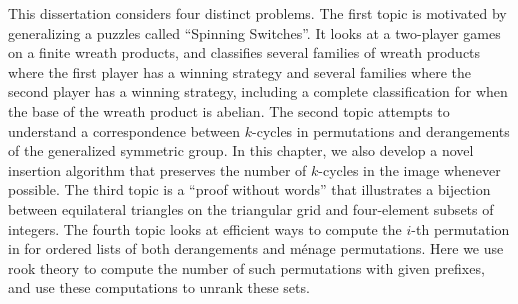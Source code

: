 This dissertation considers four distinct problems.
The first topic is motivated by generalizing a puzzles called
``Spinning Switches''. It looks at a two-player games on a finite wreath
products, and classifies several families of wreath products where
the first player has a winning strategy and several families where the
second player has a winning strategy, including a complete classification
for when the base of the wreath product is abelian.
The second topic attempts to understand a correspondence between
$k$-cycles in permutations and derangements of the generalized symmetric
group. In this chapter, we also develop a novel insertion algorithm that
preserves the number of $k$-cycles in the image whenever possible.
The third topic is a ``proof without words'' that illustrates a bijection
between equilateral triangles on the triangular grid and four-element subsets
of integers.
The fourth topic looks at efficient ways to compute the $i$-th permutation
in for ordered lists of both derangements and m\'enage permutations. Here
we use rook theory to compute the number of such permutations with given
prefixes, and use these computations to unrank these sets.
